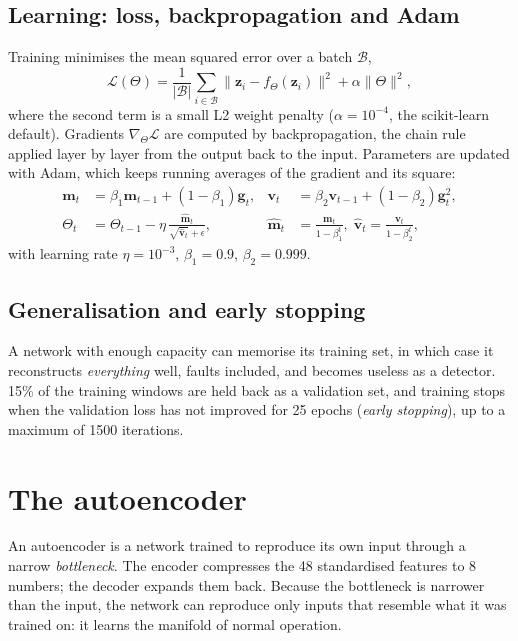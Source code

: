 \subsection{Learning: loss, backpropagation and Adam}
Training minimises the mean squared error over a batch $\mathcal B$,
\begin{equation}
  \mathcal L(\Theta) = \frac{1}{|\mathcal B|}\sum_{i\in\mathcal B}
  \lVert \bm z_i - f_\Theta(\bm z_i)\rVert^2 + \alpha\lVert\Theta\rVert^2 ,
\end{equation}
where the second term is a small L2 weight penalty ($\alpha = 10^{-4}$, the
scikit-learn default). Gradients $\nabla_\Theta\mathcal L$ are computed by
backpropagation, the chain rule applied layer by layer from the output back
to the input. Parameters are updated with Adam, which keeps running averages
of the gradient and its square:
\begin{align}
  \bm m_t &= \beta_1 \bm m_{t-1} + (1-\beta_1)\bm g_t, &
  \bm v_t &= \beta_2 \bm v_{t-1} + (1-\beta_2)\bm g_t^2, \\
  \Theta_t &= \Theta_{t-1} - \eta\,\frac{\hat{\bm m}_t}{\sqrt{\hat{\bm v}_t}+\epsilon},
  & \hat{\bm m}_t &= \frac{\bm m_t}{1-\beta_1^t},\;
    \hat{\bm v}_t = \frac{\bm v_t}{1-\beta_2^t},
\end{align}
with learning rate $\eta = 10^{-3}$, $\beta_1=0.9$, $\beta_2=0.999$.

\subsection{Generalisation and early stopping}
A network with enough capacity can memorise its training set, in which case it
reconstructs \emph{everything} well, faults included, and becomes useless as a
detector. 15\% of the training windows are held back as a validation set, and
training stops when the validation loss has not improved for 25 epochs
(\emph{early stopping}), up to a maximum of 1500 iterations.

\section{The autoencoder}

An autoencoder is a network trained to reproduce its own input through a
narrow \emph{bottleneck}. The encoder compresses the 48 standardised features
to 8 numbers; the decoder expands them back. Because the bottleneck is
narrower than the input, the network can reproduce only inputs that resemble
what it was trained on: it learns the manifold of normal operation.

